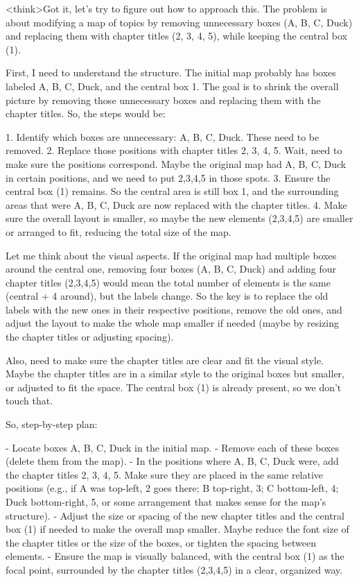 <think>Got it, let's try to figure out how to approach this. The problem is about modifying a map of topics by removing unnecessary boxes (A, B, C, Duck) and replacing them with chapter titles (2, 3, 4, 5), while keeping the central box (1). 

First, I need to understand the structure. The initial map probably has boxes labeled A, B, C, Duck, and the central box 1. The goal is to shrink the overall picture by removing those unnecessary boxes and replacing them with the chapter titles. So, the steps would be:

1. Identify which boxes are unnecessary: A, B, C, Duck. These need to be removed.
2. Replace those positions with chapter titles 2, 3, 4, 5. Wait, need to make sure the positions correspond. Maybe the original map had A, B, C, Duck in certain positions, and we need to put 2,3,4,5 in those spots.
3. Ensure the central box (1) remains. So the central area is still box 1, and the surrounding areas that were A, B, C, Duck are now replaced with the chapter titles.
4. Make sure the overall layout is smaller, so maybe the new elements (2,3,4,5) are smaller or arranged to fit, reducing the total size of the map.

Let me think about the visual aspects. If the original map had multiple boxes around the central one, removing four boxes (A, B, C, Duck) and adding four chapter titles (2,3,4,5) would mean the total number of elements is the same (central + 4 around), but the labels change. So the key is to replace the old labels with the new ones in their respective positions, remove the old ones, and adjust the layout to make the whole map smaller if needed (maybe by resizing the chapter titles or adjusting spacing).

Also, need to make sure the chapter titles are clear and fit the visual style. Maybe the chapter titles are in a similar style to the original boxes but smaller, or adjusted to fit the space. The central box (1) is already present, so we don't touch that.

So, step-by-step plan:

- Locate boxes A, B, C, Duck in the initial map.
- Remove each of these boxes (delete them from the map).
- In the positions where A, B, C, Duck were, add the chapter titles 2, 3, 4, 5. Make sure they are placed in the same relative positions (e.g., if A was top-left, 2 goes there; B top-right, 3; C bottom-left, 4; Duck bottom-right, 5, or some arrangement that makes sense for the map's structure).
- Adjust the size or spacing of the new chapter titles and the central box (1) if needed to make the overall map smaller. Maybe reduce the font size of the chapter titles or the size of the boxes, or tighten the spacing between elements.
- Ensure the map is visually balanced, with the central box (1) as the focal point, surrounded by the chapter titles (2,3,4,5) in a clear, organized way.

